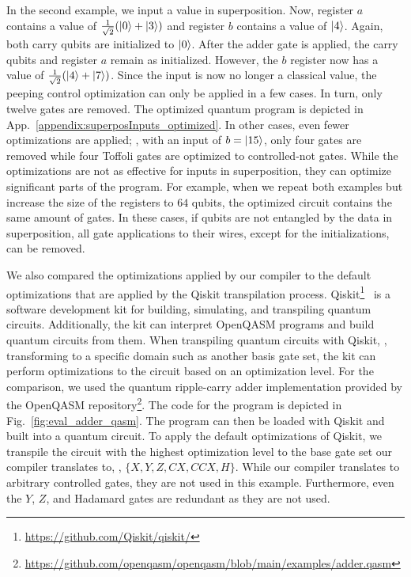 In the second example, we input a value in superposition. Now, register $a$ contains a value of $\frac{1}{\sqrt{2}} (\ket{0} + \ket{3})$ and register $b$ contains a value of $\ket{4}$. Again, both carry qubits are initialized to $\ket{0}$. After the adder gate is applied, the carry qubits and register $a$ remain as initialized. However, the $b$ register now has a value of $\frac{1}{\sqrt{2}} (\ket{4} + \ket{7})$.
Since the input is now no longer a classical value, the peeping control optimization can only be applied in a few cases. In turn, only twelve gates are removed. The optimized quantum program is depicted in App.~\ref{appendix:superposInputs_optimized}. In other cases, even fewer optimizations are applied; \eg, with an input of $b = \ket{15}$, only four gates are removed while four Toffoli gates are optimized to controlled-not gates.
While the optimizations are not as effective for inputs in superposition, they can optimize significant parts of the program. For example, when we repeat both examples but increase the size of the registers to $64$ qubits, the optimized circuit contains the same amount of gates. In these cases, if qubits are not entangled by the data in superposition, all gate applications to their wires, except for the initializations, can be removed.

We also compared the optimizations applied by our compiler to the default optimizations that are applied by the Qiskit transpilation process. Qiskit\footnote{\url{https://github.com/Qiskit/qiskit/}}~\cite{JTK*24} is a software development kit for building, simulating, and transpiling quantum circuits. Additionally, the kit can interpret OpenQASM programs and build quantum circuits from them. When transpiling quantum circuits with Qiskit, \ie, transforming to a specific domain such as another basis gate set, the kit can perform optimizations to the circuit based on an optimization level. For the comparison, we used the quantum ripple-carry adder implementation provided by the OpenQASM repository\footnote{\url{https://github.com/openqasm/openqasm/blob/main/examples/adder.qasm}}. The code for the program is depicted in Fig.~\ref{fig:eval_adder_qasm}. The program can then be loaded with Qiskit and built into a quantum circuit. To apply the default optimizations of Qiskit, we transpile the circuit with the highest optimization level to the base gate set our compiler translates to, \ie, $\{X, Y, Z, CX, CCX, H\}$. While our compiler translates to arbitrary controlled gates, they are not used in this example. Furthermore, even the $Y$, $Z$, and Hadamard gates are redundant as they are not used.

